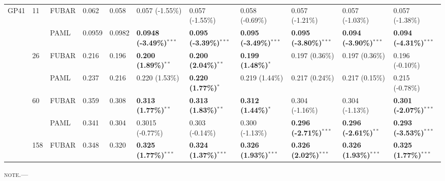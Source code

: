 \documentclass[11pt]{article}
\begin{document}
\begin{sidewaystable}[htbp]
\begin{adjustwidth}{-2.25cm}{}
\begin{tabular}{l l l l l l l l l l l}
\hline
GP41  &  11 &  FUBAR  &  0.062  &  0.058  &  0.057 (-1.55\%)  &  0.057 (-1.55\%)  &  0.058 (-0.69\%)  &  0.057 (-1.21\%)  &  0.057 (-1.03\%)  &  0.057 (-1.38\%)  \\
  &    &  PAML        &  0.0959  &  0.0982  &  \textbf{0.0948 (-3.49\%)}$^{\ast\ast\ast}$  &  \textbf{0.095 (-3.39\%)}$^{\ast\ast\ast}$  &  \textbf{0.095 (-3.49\%)}$^{\ast\ast\ast}$  &  \textbf{0.095 (-3.80\%)}$^{\ast\ast\ast}$  &  \textbf{0.094 (-3.90\%)}$^{\ast\ast\ast}$  &  \textbf{0.094 (-4.31\%)}$^{\ast\ast\ast}$  \\
\hline
  &  26  &  FUBAR     &  0.216  &  0.196  &  \textbf{0.200 (1.89\%)}$^{\ast\ast}$  &  \textbf{0.200 (2.04\%)}$^{\ast\ast}$  &  \textbf{0.199 (1.48\%)}$^{\ast}$  &  0.197 (0.36\%)  &  0.197 (0.36\%)  &  0.196 (-0.10\%)  \\ 
  &    &  PAML        &  0.237  &  0.216  &  0.220 (1.53\%)  &  \textbf{0.220 (1.77\%)}$^{\ast}$  &  0.219 (1.44\%)  &  0.217 (0.24\%)  &  0.217 (0.15\%)  &  0.215 (-0.78\%)  \\ 
\hline
  &  60  &  FUBAR     &  0.359  &  0.308  &  \textbf{0.313 (1.77\%)}$^{\ast\ast}$  &  \textbf{0.313 (1.83\%)}$^{\ast\ast}$  &  \textbf{0.312 (1.44\%)}$^{\ast}$  &  0.304 (-1.16\%)  &  0.304 (-1.13\%)  &  \textbf{0.301 (-2.07\%)}$^{\ast\ast\ast}$  \\
  &    &  PAML        &  0.341  &  0.304  &  0.3015 (-0.77\%)  &  0.303 (-0.14\%)  &  0.300 (-1.13\%)  &  \textbf{0.296 (-2.71\%)}$^{\ast\ast\ast}$  &  \textbf{0.296 (-2.61\%)}$^{\ast\ast}$  &  \textbf{0.293 (-3.53\%)}$^{\ast\ast\ast}$  \\
\hline
  &  158  &  FUBAR    &  0.348  &  0.320  &  \textbf{0.325 (1.77\%)}$^{\ast\ast\ast}$  &  \textbf{0.324 (1.37\%)}$^{\ast\ast\ast}$  &  \textbf{0.326 (1.93\%)}$^{\ast\ast\ast}$  &  \textbf{0.326 (2.02\%)}$^{\ast\ast\ast}$  &  \textbf{0.326 (1.93\%)}$^{\ast\ast\ast}$  &  \textbf{0.325 (1.77\%)}$^{\ast\ast\ast}$  \\
\hline\end{tabular}
\newline
\textsc{note.}--- %
\end{adjustwidth}
\end{sidewaystable}
\end{document}
